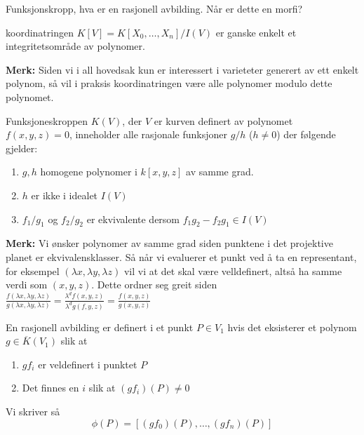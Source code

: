 Funksjonskropp, hva er en rasjonell avbilding. Når er dette en morfi?

\begin{definisjon}
koordinatringen $K[V] = K[X_0, \ldots, X_n] / I(V)$ er ganske enkelt et integritetsområde av polynomer. 

\textbf{Merk:} Siden vi i all hovedsak kun er interessert i varieteter generert av ett enkelt polynom, så vil i praksis koordinatringen være alle polynomer modulo dette polynomet.
\end{definisjon}

\begin{definisjon}
Funksjoneskroppen $K(V)$, der $V$ er kurven definert av polynomet $f(x,y,z) = 0$, inneholder alle rasjonale funksjoner $g/h$ ($h \neq 0$) der følgende gjelder:
\begin{enumerate}[noitemsep]
    \item $g,h$ homogene polynomer i $k[x,y,z]$ av samme grad.
    \item $h$ er ikke i idealet $I(V)$
    \item $f_1/g_1$ og $f_2/g_2$ er ekvivalente dersom $f_1g_2 - f_2g_1 \in I(V)$
\end{enumerate}
\end{definisjon}
\textbf{Merk:} Vi ønsker polynomer av samme grad siden punktene i det projektive planet er ekvivalensklasser. Så når vi evaluerer et punkt ved å ta en representant, for eksempel $(\lambda x, \lambda y, \lambda z )$ vil vi at det skal være velldefinert, altså ha samme verdi som $(x,y,z)$. Dette ordner seg greit siden $\frac{f(\lambda x, \lambda y, \lambda z)}{ g(\lambda x, \lambda y, \lambda z)} = \frac{\lambda^d f(x, y, z)}{\lambda^d g(f,y,z)} = \frac{f(x,y,z)}{g(x,y,z)}$



\begin{definisjon}
En rasjonell avbilding er definert i et punkt $P \in V_1$ hvis det eksisterer et polynom $g \in \overline{K}(V_1)$ slik at 
\begin{enumerate}[noitemsep]
    \item $g f_i$ er veldefinert i punktet $P$
    \item Det finnes en $i$ slik at $(gf_i)(P) \neq 0$
\end{enumerate}
Vi skriver så $$ \phi(P) = [(gf_0)(P), \ldots, (gf_n)(P)] $$
\end{definisjon}


